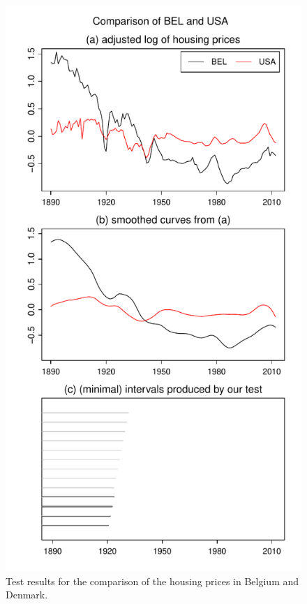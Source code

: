 \documentclass[a4paper,12pt]{article}
\begin{document}
\begin{figure}
\begin{minipage}[t]{0.24\textwidth}
\caption{Test results for the comparison of the housing prices in Belgium and Denmark.}\label{fig:hp:Belgium:Denmark}
\end{minipage}
\hspace{0.1cm}
\begin{minipage}[t]{0.24\textwidth}
\includegraphics[width=\textwidth]{output/plots/hp/BEL_vs_USA}

\end{minipage}
\end{figure}
\end{document}
